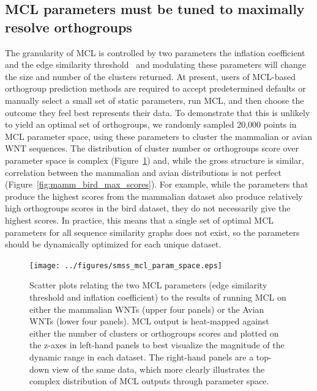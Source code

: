 \documentclass[twocolumn]{bmcart}  %
\begin{document}
\subsection{MCL parameters must be tuned to maximally resolve orthogroups}\label{subsec:TuningParams}
The granularity of MCL is controlled by two parameters \textemdash{} the inflation coefficient and the edge similarity threshold~\cite{VanDongen:kJZ890qx} \textemdash{} and modulating these parameters will change the size and number of the clusters returned.
At present, users of MCL-based orthogroup prediction methods are required to accept predetermined defaults or manually select a small set of static parameters, run MCL, and then choose the outcome they feel best represents their data.
To demonstrate that this is unlikely to yield an optimal set of orthogroups, we randomly sampled 20,000 points in MCL parameter space, using these parameters to cluster the mammalian or avian WNT sequences.
The distribution of cluster number or orthogroups score over parameter space is complex (Figure~\ref{fig:smss_mcl_param_space}) and, while the gross structure is similar, correlation between the mammalian and avian distributions is not perfect (Figure~\ref{fig:mamm_bird_max_scores}).
For example, while the parameters that produce the highest scores from the mammalian dataset also produce relatively high orthogroups scores in the bird dataset, they do not necessarily give the highest scores.
In practice, this means that a single set of optimal MCL parameters for all sequence similarity graphs does not exist,
so the parameters should be dynamically optimized for each unique dataset.


\begin{figure}[t]
  \begin{center}
  \texttt{[image: ../figures/smss\_mcl\_param\_space.eps]}
\end{center}
\caption{Scatter plots relating the two MCL parameters (edge similarity threshold and inflation coefficient) to the results of running MCL on either the mammalian WNTs (upper four panels) or the Avian WNTs (lower four panels). MCL output is heat-mapped against either the number of clusters or orthogroups scores and plotted on the z-axes in left-hand panels to best visualize the magnitude of the dynamic range in each dataset. The right-hand panels are a top-down view of the same data, which more clearly illustrates the complex distribution of MCL outputs through parameter space.}
\label{fig:smss_mcl_param_space}
\end{figure}
\end{document}
